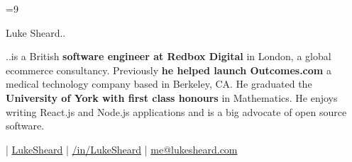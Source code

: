 \documentclass[9pt]{article}
\begin{document}
\color{body}

=9\relax     %

\raggedright



\begin{minipage}[t]{\textwidth}
  {\Huge
    Luke Sheard..
  }

  {\vspace{10pt}
    ..is a British \textbf{software engineer at Redbox Digital} in London, a global ecommerce consultancy. Previously \textbf{he helped launch Outcomes.com} a medical technology company based in Berkeley, CA. He graduated the \textbf{University of York with first class honours} in Mathematics. He enjoys writing React.js and Node.js applications and is a big advocate of open source software.
  }

  \vspace{5pt}

  | \faGithub   \hspace{5pt}   \href{https://www.github.com/LukeSheard}{LukeSheard}          \hspace{20pt}
  | \faLinkedin \hspace{5pt}   \href{http://www.linkedin.com/in/lukesheard}{/in/LukeSheard}  \hspace{20pt}
  | \faEnvelope \hspace{5pt}   \href{mailto:me@lukesheard.com}{me@lukesheard.com}

  \vspace{20pt}
\end{minipage}
\end{document}
